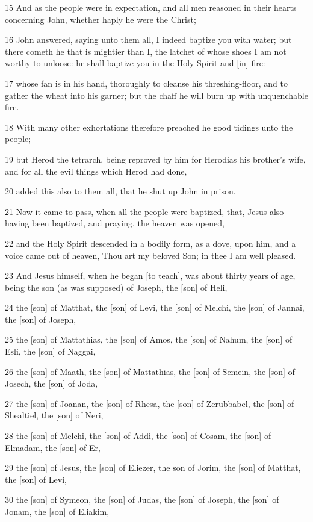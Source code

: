 \par 15 And as the people were in expectation, and all men reasoned in their hearts concerning John, whether haply he were the Christ;
\par 16 John answered, saying unto them all, I indeed baptize you with water; but there cometh he that is mightier than I, the latchet of whose shoes I am not worthy to unloose: he shall baptize you in the Holy Spirit and [in] fire:
\par 17 whose fan is in his hand, thoroughly to cleanse his threshing-floor, and to gather the wheat into his garner; but the chaff he will burn up with unquenchable fire.
\par 18 With many other exhortations therefore preached he good tidings unto the people;
\par 19 but Herod the tetrarch, being reproved by him for Herodias his brother's wife, and for all the evil things which Herod had done,
\par 20 added this also to them all, that he shut up John in prison.
\par 21 Now it came to pass, when all the people were baptized, that, Jesus also having been baptized, and praying, the heaven was opened,
\par 22 and the Holy Spirit descended in a bodily form, as a dove, upon him, and a voice came out of heaven, Thou art my beloved Son; in thee I am well pleased.
\par 23 And Jesus himself, when he began [to teach], was about thirty years of age, being the son (as was supposed) of Joseph, the [son] of Heli,
\par 24 the [son] of Matthat, the [son] of Levi, the [son] of Melchi, the [son] of Jannai, the [son] of Joseph,
\par 25 the [son] of Mattathias, the [son] of Amos, the [son] of Nahum, the [son] of Esli, the [son] of Naggai,
\par 26 the [son] of Maath, the [son] of Mattathias, the [son] of Semein, the [son] of Josech, the [son] of Joda,
\par 27 the [son] of Joanan, the [son] of Rhesa, the [son] of Zerubbabel, the [son] of Shealtiel, the [son] of Neri,
\par 28 the [son] of Melchi, the [son] of Addi, the [son] of Cosam, the [son] of Elmadam, the [son] of Er,
\par 29 the [son] of Jesus, the [son] of Eliezer, the son of Jorim, the [son] of Matthat, the [son] of Levi,
\par 30 the [son] of Symeon, the [son] of Judas, the [son] of Joseph, the [son] of Jonam, the [son] of Eliakim,
